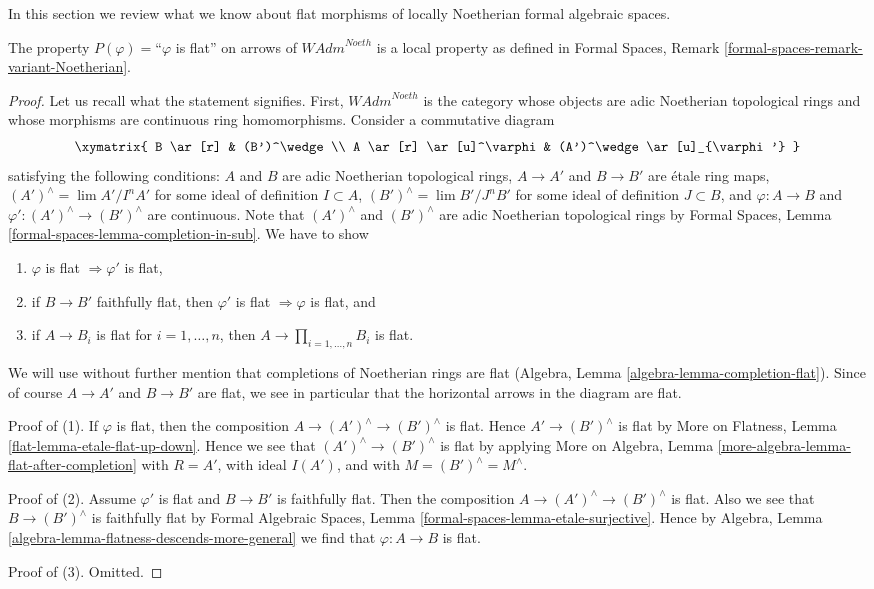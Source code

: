 \noindent
In this section we review what we know about flat morphisms
of locally Noetherian formal algebraic spaces.

\begin{lemma}
\label{lemma-flat-axioms}
The property $P(\varphi)=$``$\varphi$ is flat'' on arrows
of $\textit{WAdm}^{Noeth}$ is a local property as defined in
Formal Spaces, Remark \ref{formal-spaces-remark-variant-Noetherian}.
\end{lemma}

\begin{proof}
Let us recall what the statement signifies. First, 
$\textit{WAdm}^{Noeth}$ is the category whose objects are
adic Noetherian topological rings and whose morphisms are
continuous ring homomorphisms. Consider a commutative diagram
$$
\xymatrix{
B \ar[r] & (B')^\wedge \\
A \ar[r] \ar[u]^\varphi & (A')^\wedge \ar[u]_{\varphi'}
}
$$
satisfying the following conditions:
$A$ and $B$ are adic Noetherian topological rings,
$A \to A'$ and $B \to B'$ are \'etale ring maps,
$(A')^\wedge = \lim A'/I^nA'$ for some ideal of definition $I \subset A$,
$(B')^\wedge = \lim B'/J^nB'$ for some ideal of definition $J \subset B$, and
$\varphi : A \to B$ and $\varphi' : (A')^\wedge \to (B')^\wedge$
are continuous. Note that $(A')^\wedge$ and $(B')^\wedge$ are
adic Noetherian topological rings by
Formal Spaces, Lemma \ref{formal-spaces-lemma-completion-in-sub}.
We have to show
\begin{enumerate}
\item $\varphi$ is flat $\Rightarrow \varphi'$ is flat,
\item if $B \to B'$ faithfully flat, then $\varphi'$ is flat
$\Rightarrow \varphi$ is flat, and
\item if $A \to B_i$ is flat for $i = 1, \ldots, n$, then
$A \to \prod_{i = 1, \ldots, n} B_i$ is flat.
\end{enumerate}
We will use without further mention that completions of Noetherian rings
are flat (Algebra, Lemma \ref{algebra-lemma-completion-flat}). Since
of course $A \to A'$ and $B \to B'$ are flat, we see in
particular that the horizontal arrows in the diagram are flat.

\medskip\noindent
Proof of (1). If $\varphi$ is flat, then the composition
$A \to (A')^\wedge \to (B')^\wedge$ is flat. Hence $A' \to (B')^\wedge$
is flat by More on Flatness, Lemma \ref{flat-lemma-etale-flat-up-down}.
Hence we see that $(A')^\wedge \to (B')^\wedge$ is flat by applying
More on Algebra, Lemma \ref{more-algebra-lemma-flat-after-completion}
with $R = A'$, with ideal $I(A')$, and with $M = (B')^\wedge = M^\wedge$.

\medskip\noindent
Proof of (2). Assume $\varphi'$ is flat and $B \to B'$ is faithfully flat.
Then the composition $A \to (A')^\wedge \to (B')^\wedge$ is flat.
Also we see that $B \to (B')^\wedge$ is faithfully flat by
Formal Algebraic Spaces, Lemma
\ref{formal-spaces-lemma-etale-surjective}.
Hence by Algebra, Lemma \ref{algebra-lemma-flatness-descends-more-general}
we find that $\varphi : A \to B$ is flat.

\medskip\noindent
Proof of (3). Omitted.
\end{proof}


